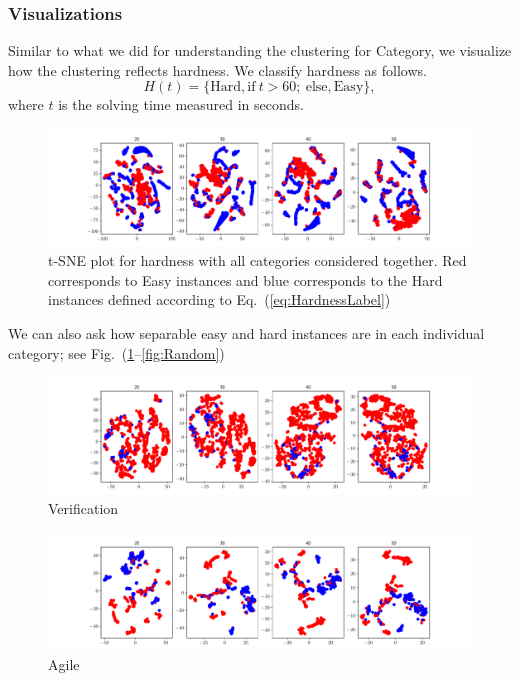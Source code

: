 \documentclass[10pt]{article}
\begin{document}
\subsubsection{Visualizations}
Similar to what we did for understanding the clustering for Category, we visualize
how the clustering reflects hardness. We classify hardness as follows. 
\begin{equation}
    \label{eq:HardnessLabel}
    H(t) = \{\mathrm{Hard, if~}t > 60 \mathrm{;~else, Easy} \},
\end{equation}
where $t$ is the solving time measured in seconds.  
\begin{figure}[h]
\includegraphics[width=\linewidth]{tSNE/Hardness.pdf}
\caption{t-SNE plot for hardness with all categories considered together. Red
corresponds to Easy instances and blue corresponds to the Hard instances
defined according to Eq.~(\ref{eq:HardnessLabel})}
\end{figure}
We can also ask how separable easy and hard instances are in each individual
category; see Fig.~(\ref{fig:Verification}--\ref{fig:Random})   
\begin{figure}[h]
    \label{fig:Verification}
\includegraphics[width=\linewidth]{tSNE/Hardness_Verification.pdf}
\caption{Verification}
\end{figure}
\begin{figure}[h]
\includegraphics[width=\linewidth]{tSNE/Hardness_Agile.pdf}
\caption{Agile}
\end{figure}
\end{document}
